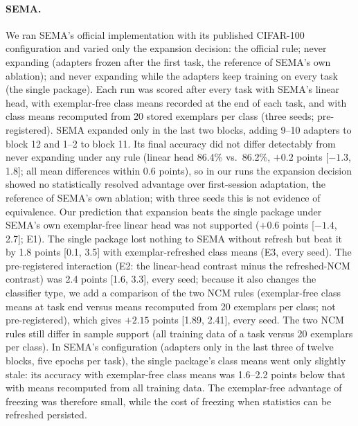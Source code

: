 \documentclass[10pt]{article}
\begin{document}
\paragraph{SEMA.} We ran SEMA's official implementation with its published CIFAR-100 configuration and varied only the expansion decision: the official rule; never expanding (adapters frozen after the first task, the reference of SEMA's own ablation); and never expanding while the adapters keep training on every task (the single package). Each run was scored after every task with SEMA's linear head, with exemplar-free class means recorded at the end of each task, and with class means recomputed from 20 stored exemplars per class (three seeds; pre-registered). SEMA expanded only in the last two blocks, adding 9--10 adapters to block 12 and 1--2 to block 11. Its final accuracy did not differ detectably from never expanding under any rule (linear head 86.4\% vs.\ 86.2\%, $+0.2$ points [$-1.3$, 1.8]; all mean differences within 0.6 points), so in our runs the expansion decision showed no statistically resolved advantage over first-session adaptation, the reference of SEMA's own ablation; with three seeds this is not evidence of equivalence. Our prediction that expansion beats the single package under SEMA's own exemplar-free linear head was not supported ($+0.6$ points [$-1.4$, 2.7]; E1). The single package lost nothing to SEMA without refresh but beat it by 1.8 points [0.1, 3.5] with exemplar-refreshed class means (E3, every seed). The pre-registered interaction (E2: the linear-head contrast minus the refreshed-NCM contrast) was 2.4 points [1.6, 3.3], every seed; because it also changes the classifier type, we add a comparison of the two NCM rules (exemplar-free class means at task end versus means recomputed from 20 exemplars per class; not pre-registered), which gives $+2.15$ points [1.89, 2.41], every seed. The two NCM rules still differ in sample support (all training data of a task versus 20 exemplars per class). In SEMA's configuration (adapters only in the last three of twelve blocks, five epochs per task), the single package's class means went only slightly stale: its accuracy with exemplar-free class means was 1.6--2.2 points below that with means recomputed from all training data. The exemplar-free advantage of freezing was therefore small, while the cost of freezing when statistics can be refreshed persisted.
\end{document}
